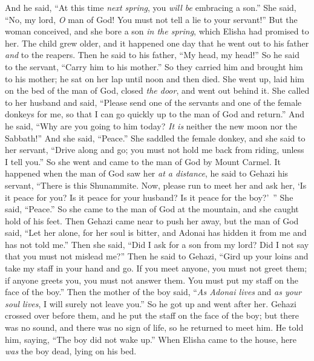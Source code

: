 \begin{biblechapter}
\verse And he said, “At this time \textit{next spring}, you \textit{will be} embracing a son.” She said, “No, my lord, \textit{O} man of God! You must not tell a lie to your servant!”
\verse But the woman conceived, and she bore a son \textit{in the spring}, which Elisha had promised to her.
 The child grew older, and it happened one day that he went out to his father \textit{and} to the reapers.
\verse Then he said to his father, “My head, my head!” So he said to the servant, “Carry him to his mother.”
\verse So they carried him and brought him to his mother; he sat on her lap until noon and then died.
\verse She went up, laid him on the bed of the man of God, closed \textit{the door}, and went out behind it.
\verse She called to her husband and said, “Please send one of the servants and one of the female donkeys for me, so that I can go quickly up to the man of God and return.”
\verse And he said, “Why are you going to him today? \textit{It is} neither the new moon nor the Sabbath!” And she said, “Peace.”
\verse She saddled the female donkey, and she said to her servant, “Drive along and go; you must not hold me back from riding, unless I tell you.”
\verse So she went and came to the man of God by Mount Carmel. It happened when the man of God saw her \textit{at a distance}, he said to Gehazi his servant, “There is this Shunammite.
\verse Now, please run to meet her and ask her, ‘Is it peace for you? Is it peace for your husband? Is it peace for the boy?’ ” She said, “Peace.”
\verse So she came to the man of God at the mountain, and she caught hold of his feet. Then Gehazi came near to push her away, but the man of God said, “Let her alone, for her soul is bitter, and Adonai has hidden it from me and has not told me.”
\verse Then she said, “Did I ask for a son from my lord? Did I not say that you must not mislead me?”
\verse Then he said to Gehazi, “Gird up your loins and take my staff in your hand and go. If you meet anyone, you must not greet them; if anyone greets you, you must not answer them. You must put my staff on the face of the boy.”
\verse Then the mother of the boy said, “\textit{As Adonai lives} and \textit{as your soul lives}, I will surely not leave you.” So he got up and went after her.
\verse Gehazi crossed over before them, and he put the staff on the face of the boy; but there was no sound, and there was no sign of life, so he returned to meet him. He told him, saying, “The boy did not wake up.”
\verse When Elisha came to the house, here \textit{was} the boy dead, lying on his bed.

\end{biblechapter}
